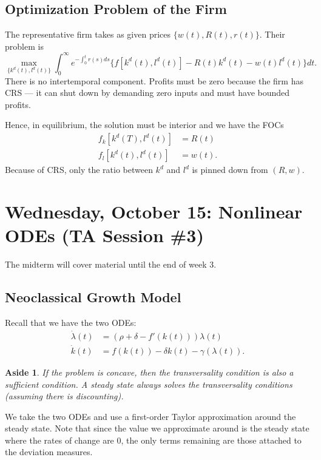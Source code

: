 \documentclass{tufte-handout}
\newtheorem{aside}[thm]{Aside}
\theoremstyle{definition}
\begin{document}
\subsection{Optimization Problem of the Firm}
The representative firm takes as given prices $\{w(t), R(t), r(t)\}$. Their problem is \[
	\max_{\{k^d(t), l^d(t)\}} \int_{0}^{\infty} e^{-\int_{0}^{t} r(s)ds } \{f\left[ k^d(t), l^d(t) \right] - R(t) k^d(t) - w(t)l^d(t)\}dt 
.\] There is no intertemporal component. Profits must be zero because the firm has CRS --- it can shut down by demanding zero inputs and must have bounded profits.

Hence, in equilibrium, the solution must be interior and we have the FOCs
\begin{align*}
	f_k \left[ k^d(T), l^d(t) \right] &= R(t) \\
	f_l \left[ k^d(t), l^d(t) \right] &= w(t)
.\end{align*}
Because of CRS, only the ratio between $k^d$ and $l^d$ is pinned down from $(R,w)$.

\section{Wednesday, October 15: Nonlinear ODEs (TA Session \#3)}

The midterm will cover material until the end of week 3.

\subsection{Neoclassical Growth Model}
Recall that we have the two ODEs:
\begin{align*}
	\dot{\lambda}(t) &= \left( \rho + \delta - f'(k(t)) \right)\lambda(t) \\
	\dot{k}(t) &= f(k(t)) -\delta k(t) -\gamma(\lambda(t))
.\end{align*}

\begin{aside}
	If the problem is concave, then the transversality condition is also a sufficient condition. A steady state always solves the transversality conditions (assuming there is discounting).
\end{aside}
We take the two ODEs and use a first-order Taylor approximation around the steady state. Note that since the value we approximate around is the steady state where the rates of change are $0$, the only terms remaining are those attached to the deviation measures. 
\end{document}
